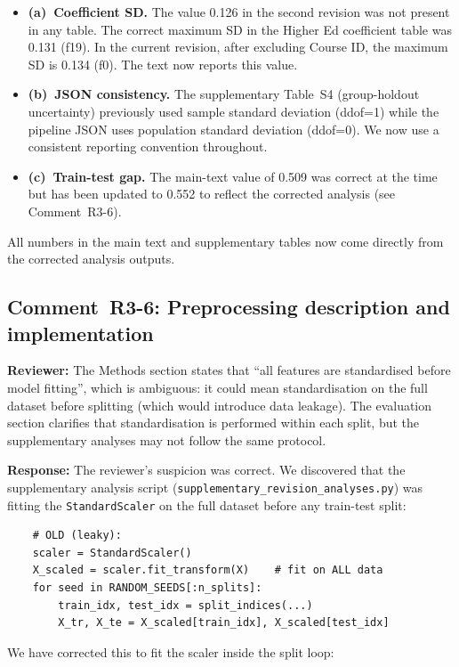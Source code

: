 \documentclass[10pt,letterpaper]{article}
\begin{document}
\begin{itemize}
\item \textbf{(a)~Coefficient SD.}  The value 0.126 in the second
  revision was not present in any table.  The correct maximum SD in the
  Higher Ed coefficient table was 0.131 (f19).  In the current revision,
  after excluding Course ID, the maximum SD is 0.134 (f0).  The text now
  reports this value.
\item \textbf{(b)~JSON consistency.}  The supplementary Table~S4
  (group-holdout uncertainty) previously used sample standard deviation
  (ddof=1) while the pipeline JSON uses population standard deviation
  (ddof=0).  We now use a consistent reporting convention throughout.
\item \textbf{(c)~Train-test gap.}  The main-text value of 0.509 was
  correct at the time but has been updated to 0.552 to reflect the
  corrected analysis (see Comment~R3-6).
\end{itemize}

All numbers in the main text and supplementary tables now come directly
from the corrected analysis outputs.

\subsection*{Comment~R3-6: Preprocessing description and implementation}

\textbf{Reviewer:} The Methods section states that ``all features are
standardised before model fitting'', which is ambiguous: it could mean
standardisation on the full dataset before splitting (which would
introduce data leakage).  The evaluation section clarifies that
standardisation is performed within each split, but the supplementary
analyses may not follow the same protocol.

\textbf{Response:} The reviewer's suspicion was correct.  We discovered
that the supplementary analysis script (\texttt{supplementary\_revision\_analyses.py})
was fitting the \texttt{StandardScaler} on the full dataset before any
train-test split:

\begin{verbatim}
    # OLD (leaky):
    scaler = StandardScaler()
    X_scaled = scaler.fit_transform(X)    # fit on ALL data
    for seed in RANDOM_SEEDS[:n_splits]:
        train_idx, test_idx = split_indices(...)
        X_tr, X_te = X_scaled[train_idx], X_scaled[test_idx]
\end{verbatim}

We have corrected this to fit the scaler inside the split loop:
\end{document}

